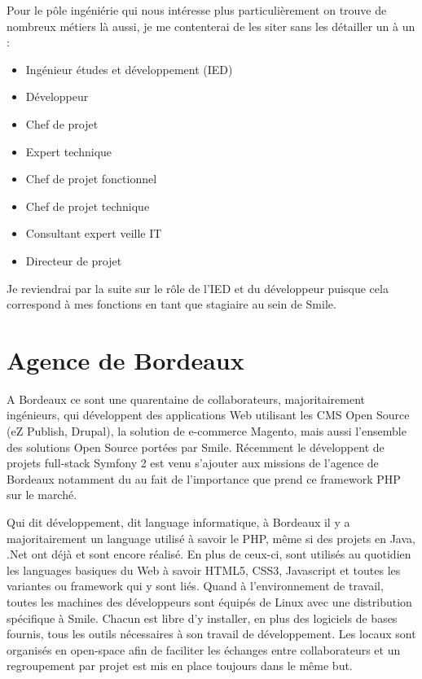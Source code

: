 \documentclass[a4paper,11pt,twoside]{report}
\begin{document}
  Pour le pôle ingéniérie qui nous intéresse plus particulièrement on trouve de nombreux métiers là aussi, je me contenterai de les siter sans les détailler un à un :\newline
  \begin{itemize}

    \item Ingénieur études et développement (IED)
    \item Développeur
    \item Chef de projet
    \item Expert technique
    \item Chef de projet fonctionnel
    \item Chef de projet technique
    \item Consultant expert veille IT
    \item Directeur de projet
    \newline
  \end{itemize}
  
  Je reviendrai par la suite sur le rôle de l'IED et du développeur puisque cela correspond à mes fonctions en tant que stagiaire au sein de Smile.
  
  \section{Agence de Bordeaux}
  A Bordeaux ce sont une quarentaine de collaborateurs, majoritairement ingénieurs, qui développent des applications Web utilisant les CMS Open Source (eZ Publish, Drupal), la solution de e-commerce Magento, mais aussi l’ensemble des solutions Open Source portées par Smile. Récemment le développent de projets full-stack Symfony 2 est venu s'ajouter aux missions de l'agence de Bordeaux notamment du au fait de l'importance que prend ce framework PHP sur le marché.\newline

  Qui dit développement, dit language informatique, à Bordeaux il y a majoritairement un language utilisé à savoir le PHP, même si des projets en Java, .Net ont déjà et sont encore réalisé. En plus de ceux-ci, sont utilisés au quotidien les languages basiques du Web à savoir HTML5, CSS3, Javascript et toutes les variantes ou framework qui y sont liés. Quand à l'environnement de travail, toutes les machines des développeurs sont équipés de Linux avec une distribution spécifique à Smile. Chacun est libre d'y installer, en plus des logiciels de bases fournis, tous les outils nécessaires à son travail de développement. Les locaux sont organisés en open-space afin de faciliter les échanges entre collaborateurs et un regroupement par projet est mis en place toujours dans le même but.
  
\end{document}

